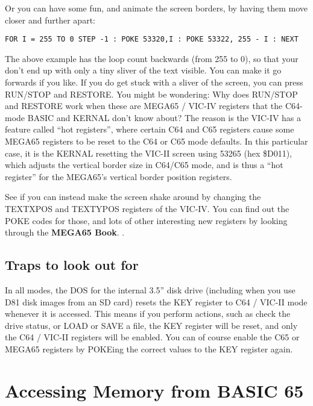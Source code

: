 Or you can have some fun, and animate the screen borders, by having them move closer and further apart:

\begin{tcolorbox}[colback=black,coltext=white]
\verbatimfont{\codefont}
\begin{verbatim}
FOR I = 255 TO 0 STEP -1 : POKE 53320,I : POKE 53322, 255 - I : NEXT
\end{verbatim}
\end{tcolorbox}

The above example has the loop count backwards (from 255 to 0), so that your don't end up with only a
tiny sliver of the text visible. You can make it go forwards if you like. If you do get stuck with a sliver
of the screen, you can press RUN/STOP and RESTORE. You might be wondering: Why does RUN/STOP
and RESTORE work when these are MEGA65 / VIC-IV registers that the C64-mode BASIC and KERNAL
don't know about?  The reason is the VIC-IV has a feature called ``hot registers'',
where certain C64 and C65 registers cause some MEGA65 registers to be reset to the C64 or
C65 mode defaults. In this particular case, it is the KERNAL resetting the VIC-II screen using
53265 (hex \$D011), which adjusts the vertical border size in C64/C65 mode, and is thus a ``hot register''
for the MEGA65's vertical border position registers.

See if you can instead make the screen shake around by changing the TEXTXPOS and TEXTYPOS registers of
the VIC-IV.  You can find out the POKE codes for those, and lots of other interesting new registers
by looking through
\ifdefined\printmanual
 the {\bf MEGA65 Book}.
\else
 .
\fi


\subsection{Traps to look out for}

In all modes, the DOS for the internal 3.5'' disk drive (including when you use D81 disk images from
an SD card) resets the KEY register to C64 / VIC-II mode whenever it is accessed. This means if you perform actions,
such as check the drive status, or LOAD or SAVE a file, the KEY register will be reset, and only the C64 / VIC-II registers
will be enabled. You can of course enable the C65 or MEGA65 registers by POKEing the correct values
to the KEY register again.

\section{Accessing Memory from BASIC 65}

